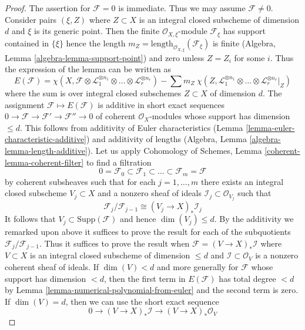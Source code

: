 \begin{proof}
The assertion for $\mathcal{F} = 0$ is immediate. Thus we may assume
$\mathcal{F} \not = 0$.
Consider pairs $(\xi , Z)$ where $Z \subset X$ is an integral
closed subscheme of dimension $d$ and $\xi$ is its generic point.
Then the finite $\mathcal{O}_{X, \xi}$-module $\mathcal{F}_\xi$
has support contained in $\{\xi\}$ hence the length
$m_Z = \text{length}_{\mathcal{O}_{X, \xi}}(\mathcal{F}_\xi)$
is finite (Algebra, Lemma \ref{algebra-lemma-support-point})
and zero unless $Z = Z_i$ for some $i$. Thus the expression
of the lemma can be written as
$$
E(\mathcal{F}) =
\chi(X, \mathcal{F} \otimes \mathcal{L}_1^{\otimes n_1} \otimes \ldots \otimes
\mathcal{L}_r^{\otimes n_r}) -
\sum\nolimits
m_Z\ \chi(Z, \mathcal{L}_1^{\otimes n_1} \otimes \ldots \otimes
\mathcal{L}_r^{\otimes n_r}|_Z)
$$
where the sum is over integral closed subschemes $Z \subset X$
of dimension $d$. The assignment $\mathcal{F} \mapsto E(\mathcal{F})$
is additive in short exact sequences
$0 \to \mathcal{F} \to \mathcal{F}' \to \mathcal{F}'' \to 0$
of coherent $\mathcal{O}_X$-modules whose support has dimension
$\leq d$. This follows from additivity of Euler characteristics
(Lemma \ref{lemma-euler-characteristic-additive})
and additivity of lengths
(Algebra, Lemma \ref{algebra-lemma-length-additive}).
Let us apply Cohomology of Schemes, Lemma \ref{coherent-lemma-coherent-filter}
to find a filtration
$$
0 = \mathcal{F}_0 \subset \mathcal{F}_1 \subset
\ldots \subset \mathcal{F}_m = \mathcal{F}
$$
by coherent subsheaves such that for each $j = 1, \ldots, m$
there exists an integral closed subscheme $V_j \subset X$
and a nonzero sheaf of ideals $\mathcal{I}_j \subset \mathcal{O}_{V_j}$
such that
$$
\mathcal{F}_j/\mathcal{F}_{j - 1}
\cong (V_j \to X)_* \mathcal{I}_j
$$
It follows that $V_j \subset \text{Supp}(\mathcal{F})$ and
hence $\dim(V_j) \leq d$.
By the additivity we remarked upon above it suffices to
prove the result for each of the subquotients
$\mathcal{F}_j/\mathcal{F}_{j - 1}$. Thus it suffices to prove
the result when $\mathcal{F} = (V \to X)_*\mathcal{I}$ where
$V \subset X$ is an integral closed subscheme of dimension $\leq d$
and $\mathcal{I} \subset \mathcal{O}_V$ is a nonzero coherent
sheaf of ideals. If $\dim(V) < d$ and more generally for $\mathcal{F}$
whose support has dimension $< d$, then the first term
in $E(\mathcal{F})$ has total degree $< d$ by
Lemma \ref{lemma-numerical-polynomial-from-euler}
and the second term is zero. If $\dim(V) = d$, then we can use the
short exact sequence
$$
0 \to (V \to X)_*\mathcal{I} \to (V \to X)_*\mathcal{O}_V
$$
\end{proof}
